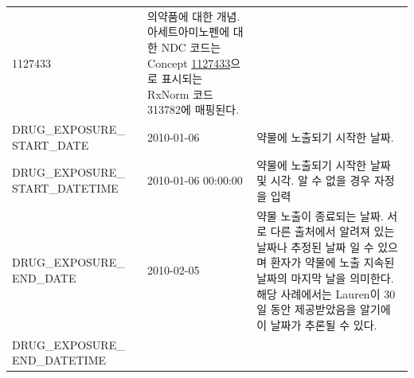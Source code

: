 \documentclass[11pt]{book}
\theoremstyle{definition}
\theoremstyle{definition}
\theoremstyle{definition}
\theoremstyle{remark}
\begin{document}
\begin{longtable}[]{@{}lll@{}}
\begin{minipage}[t]{0.16\columnwidth}
1127433\strut
\end{minipage} & \begin{minipage}[t]{0.48\columnwidth}\raggedright\strut
의약품에 대한 개념. 아세트아미노펜에 대한 NDC 코드는 Concept
\href{http://athena.ohdsi.org/search-terms/terms/1127433}{1127433}으로
표시되는 RxNorm 코드 313782에 매핑된다.\strut
\end{minipage}\tabularnewline
\begin{minipage}[t]{0.28\columnwidth}\raggedright\strut
DRUG\_EXPOSURE\_ START\_DATE\strut
\end{minipage} & \begin{minipage}[t]{0.16\columnwidth}\raggedright\strut
2010-01-06\strut
\end{minipage} & \begin{minipage}[t]{0.48\columnwidth}\raggedright\strut
약물에 노출되기 시작한 날짜.\strut
\end{minipage}\tabularnewline
\begin{minipage}[t]{0.28\columnwidth}\raggedright\strut
DRUG\_EXPOSURE\_ START\_DATETIME\strut
\end{minipage} & \begin{minipage}[t]{0.16\columnwidth}\raggedright\strut
2010-01-06 00:00:00\strut
\end{minipage} & \begin{minipage}[t]{0.48\columnwidth}\raggedright\strut
약물에 노출되기 시작한 날짜 및 시각. 알 수 없을 경우 자정을 입력\strut
\end{minipage}\tabularnewline
\begin{minipage}[t]{0.28\columnwidth}\raggedright\strut
DRUG\_EXPOSURE\_ END\_DATE\strut
\end{minipage} & \begin{minipage}[t]{0.16\columnwidth}\raggedright\strut
2010-02-05\strut
\end{minipage} & \begin{minipage}[t]{0.48\columnwidth}\raggedright\strut
약물 노출이 종료되는 날짜. 서로 다른 출처에서 알려져 있는 날짜나 추정된
날짜 일 수 있으며 환자가 약물에 노출 지속된 날짜의 마지막 날을 의미한다.
해당 사례에서는 Lauren이 30일 동안 제공받았음을 알기에 이 날짜가 추론될
수 있다.\strut
\end{minipage}\tabularnewline
\begin{minipage}[t]{0.28\columnwidth}\raggedright\strut
DRUG\_EXPOSURE\_ END\_DATETIME\strut
\end{minipage} & \begin{minipage}[t]{0.16\columnwidth}\raggedright\strut

\end{minipage}
\end{longtable}
\end{document}
